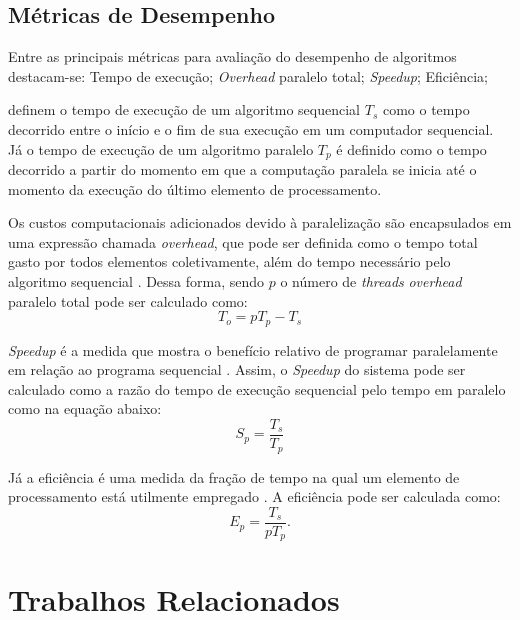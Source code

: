 \documentclass[12pt]{article}
\begin{document}
\subsection{Métricas de Desempenho}
 Entre as principais métricas para avaliação do desempenho de algoritmos destacam-se: Tempo de execução; \textit{Overhead} paralelo total; \textit{Speedup}; Eficiência;
\par
\cite{grama2003} definem o tempo de execução de um algoritmo sequencial $T_s$ como o tempo decorrido entre o início e o fim de sua execução em um computador sequencial. Já o tempo de execução de um algoritmo paralelo $T_p$ é definido como o tempo decorrido a partir do momento em que a computação paralela se inicia até o momento da execução do último elemento de processamento.
\par
Os custos computacionais adicionados devido à paralelização são encapsulados em uma expressão chamada \textit{overhead}, que pode ser definida como o tempo total gasto por todos elementos coletivamente, além do tempo necessário pelo algoritmo sequencial \cite{grama2003}. Dessa forma, sendo $p$ o número de \textit{threads} \textit{overhead} paralelo total pode ser calculado como:
\begin{equation}
T_o = pT_p - T_s
\end{equation}
\par
\textit{Speedup} é a medida que mostra o benefício relativo de programar paralelamente em relação ao programa sequencial \cite{grama2003}. Assim, o \textit{Speedup} do sistema pode ser calculado como a razão do tempo de execução sequencial pelo tempo em paralelo como na equação abaixo:  
\begin{equation}
S_p = \frac{T_s}{T_p}
\end{equation}
\par
Já a eficiência é uma medida da fração de tempo na qual um elemento de processamento está utilmente empregado \cite{grama2003}. A eficiência pode ser calculada como:
\begin{equation}
E_p = \frac{T_s}{pT_p}.
\end{equation}


\section{Trabalhos Relacionados}
\end{document}
